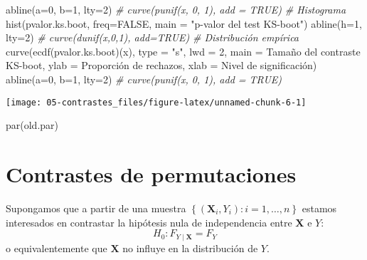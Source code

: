 \documentclass[
]{book}
\newenvironment{Shaded}{\begin{snugshade}}{\end{snugshade}}
\newcommand{\AttributeTok}[1]{\textcolor[rgb]{0.77,0.63,0.00}{#1}}
\newcommand{\CommentTok}[1]{\textcolor[rgb]{0.56,0.35,0.01}{\textit{#1}}}
\newcommand{\ConstantTok}[1]{\textcolor[rgb]{0.00,0.00,0.00}{#1}}
\newcommand{\DecValTok}[1]{\textcolor[rgb]{0.00,0.00,0.81}{#1}}
\newcommand{\FunctionTok}[1]{\textcolor[rgb]{0.00,0.00,0.00}{#1}}
\newcommand{\NormalTok}[1]{#1}
\newcommand{\StringTok}[1]{\textcolor[rgb]{0.31,0.60,0.02}{#1}}
\theoremstyle{break}
\theoremstyle{definition}
\theoremstyle{definition}
\theoremstyle{definition}
\theoremstyle{definition}
\theoremstyle{remark}
\begin{document}
\begin{Shaded}
\begin{Highlighting}[]
\FunctionTok{abline}\NormalTok{(}\AttributeTok{a=}\DecValTok{0}\NormalTok{, }\AttributeTok{b=}\DecValTok{1}\NormalTok{, }\AttributeTok{lty=}\DecValTok{2}\NormalTok{)   }\CommentTok{\# curve(punif(x, 0, 1), add = TRUE)}
\CommentTok{\# Histograma}
\FunctionTok{hist}\NormalTok{(pvalor.ks.boot, }\AttributeTok{freq=}\ConstantTok{FALSE}\NormalTok{, }\AttributeTok{main =} \StringTok{"p{-}valor del test KS{-}boot"}\NormalTok{)}
\FunctionTok{abline}\NormalTok{(}\AttributeTok{h=}\DecValTok{1}\NormalTok{, }\AttributeTok{lty=}\DecValTok{2}\NormalTok{)   }\CommentTok{\# curve(dunif(x,0,1), add=TRUE)}
\CommentTok{\# Distribución empírica}
\FunctionTok{curve}\NormalTok{(}\FunctionTok{ecdf}\NormalTok{(pvalor.ks.boot)(x), }\AttributeTok{type =} \StringTok{"s"}\NormalTok{, }\AttributeTok{lwd =} \DecValTok{2}\NormalTok{, }
      \AttributeTok{main =} \StringTok{\textquotesingle{}Tamaño del contraste KS{-}boot\textquotesingle{}}\NormalTok{, }\AttributeTok{ylab =} \StringTok{\textquotesingle{}Proporción de rechazos\textquotesingle{}}\NormalTok{, }
      \AttributeTok{xlab =} \StringTok{\textquotesingle{}Nivel de significación\textquotesingle{}}\NormalTok{)}
\FunctionTok{abline}\NormalTok{(}\AttributeTok{a=}\DecValTok{0}\NormalTok{, }\AttributeTok{b=}\DecValTok{1}\NormalTok{, }\AttributeTok{lty=}\DecValTok{2}\NormalTok{)   }\CommentTok{\# curve(punif(x, 0, 1), add = TRUE)}
\end{Highlighting}
\end{Shaded}

\begin{center}\texttt{[image: 05-contrastes\_files/figure-latex/unnamed-chunk-6-1]} \end{center}

\begin{Shaded}
\begin{Highlighting}[]
\FunctionTok{par}\NormalTok{(old.par)}
\end{Highlighting}
\end{Shaded}

\hypertarget{contrastes-de-permutaciones}{%
\section{Contrastes de permutaciones}\label{contrastes-de-permutaciones}}

Supongamos que a partir de una muestra
\(\left\{ \left( \mathbf{X}_i, Y_i\right): i=1,\ldots, n \right\}\)
estamos interesados en contrastar la hipótesis nula de independencia
entre \(\mathbf{X}\) e \(Y\):
\[H_0: F_{Y \mid \mathbf{X}} = F_Y\]
o equivalentemente que \(\mathbf{X}\) no influye en la distribución de \(Y\).
\end{document}
